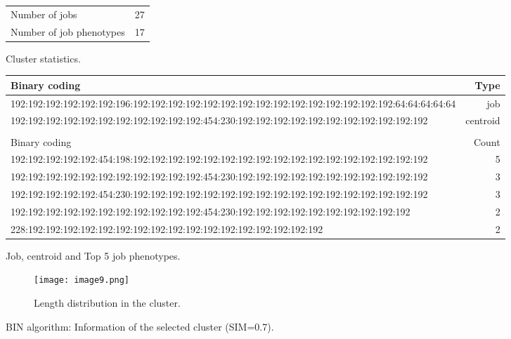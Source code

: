 \documentclass{jhps}
\begin{document}
\begin{figure}
	\begin{subtable}{\textwidth}
		\centering
		\begin{tabular}{ll}
			Number of jobs & 27 \\
			Number of job phenotypes & 17 \\
		\end{tabular}
		\caption{Cluster statistics.}
		\label{cluster:use_case:bin_all:stats}
	\end{subtable}
	\medskip
	\begin{subtable}{\textwidth}
		\centering
		\begin{tiny}
			\begin{tabular}{l|r}
				\rowcolor{tblhead}
				Binary coding                                                                                          &  Type     \\
				\hline
				192:192:192:192:192:192:196:192:192:192:192:192:192:192:192:192:192:192:192:192:192:192:64:64:64:64:64 &  job      \\
				192:192:192:192:192:192:192:192:192:192:192:454:230:192:192:192:192:192:192:192:192:192:192:192        &  centroid \\
				\multicolumn{2}{l}{}                                                                                   \\
				\rowcolor{tblhead}
				Binary coding                                                                                          &  Count    \\
				\hline
				192:192:192:192:192:454:198:192:192:192:192:192:192:192:192:192:192:192:192:192:192:192:192:192        &  5        \\
				192:192:192:192:192:192:192:192:192:192:192:454:230:192:192:192:192:192:192:192:192:192:192:192        &  3        \\
				192:192:192:192:192:454:230:192:192:192:192:192:192:192:192:192:192:192:192:192:192:192:192:192        &  3        \\
				192:192:192:192:192:192:192:192:192:192:192:454:230:192:192:192:192:192:192:192:192:192:192            &  2        \\
				228:192:192:192:192:192:192:192:192:192:192:192:192:192:192:192:192:192                                &  2        \\
			\end{tabular}
		\end{tiny}
		\caption{Job, centroid and Top 5 job phenotypes.}
		\label{cluster:use_case:bin_all:top_jobs}
	\end{subtable}
	\medskip
	\begin{subfigure}{\textwidth}
		\centering
		\texttt{[image: image9.png]}
		\caption{Length distribution in the cluster.}
		\label{cluster:use_case:bin_all:length}
	\end{subfigure}
	\caption{BIN algorithm: Information of the selected cluster (SIM=0.7).}
	\label{cluster:use_case:bin}
\end{figure}
\end{document}
